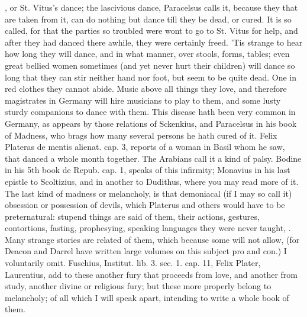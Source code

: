 {, or St. Vitus's dance; the lascivious dance, 
Paracelsus calls it, because they that are taken from it, can do
nothing but dance till they be dead, or cured. It is so called, for
that the parties so troubled were wont to go to St. Vitus for help, and
after they had danced there awhile, they were certainly freed.
'Tis strange to hear how long they will dance, and in what manner, over
stools, forms, tables; even great bellied women sometimes (and yet
never hurt their children) will dance so long that they can stir
neither hand nor foot, but seem to be quite dead. One in red clothes
they cannot abide. Music above all things they love, and therefore
magistrates in Germany will hire musicians to play to them, and some
lusty sturdy companions to dance with them. This disease hath been very
common in Germany, as appears by those relations of Sckenkius, and
Paracelsus in his book of Madness, who brags how many several persons
he hath cured of it. Felix Plateras de mentis alienat. cap. 3, reports
of a woman in Basil whom he saw, that danced a whole month together.
The Arabians call it a kind of palsy. Bodine in his 5th book de Repub.
cap. 1, speaks of this infirmity; Monavius in his last epistle to
Scoltizius, and in another to Dudithus, where you may read more of it.
The last kind of madness or melancholy, is that demoniacal (if I may so
call it) obsession or possession of devils, which Platerus and others
would have to be preternatural: stupend things are said of them, their
actions, gestures, contortions, fasting, prophesying, speaking
languages they were never taught, \etc{}. Many strange stories are related
of them, which because some will not allow, (for Deacon and Darrel have
written large volumes on this subject pro and con.) I voluntarily omit.
Fuschius, Institut. lib. 3. sec. 1. cap. 11, Felix Plater,
Laurentius, add to these another fury that proceeds from love, and
another from study, another divine or religious fury; but these more
properly belong to melancholy; of all which I will speak apart,
intending to write a whole book of them.

}
